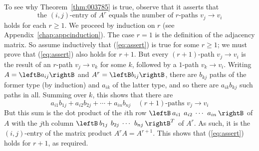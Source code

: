 To see why Theorem~\ref{thm:003785} is true, observe that it asserts that
\begin{equation} \label{eq:assert}
\mbox{the } (i, j)\mbox{-entry of } A^{r} \mbox{ equals the number of } r\mbox{-paths } v_{j} \rightarrow v_{i}
\end{equation}
holds for each $r \geq 1$. We proceed by induction on $r$ (see Appendix~\ref{chap:appcinduction}). The case $r = 1$ is the definition of the adjacency matrix. So assume inductively that (\ref{eq:assert}) is true for some $r \geq 1$; we must prove that (\ref{eq:assert}) also holds for $r + 1$. But every $(r + 1)$-path $v_{j} \to v_{i}$ is the result of an $r$-path $v_{j} \to v_{k}$ for some $k$, followed by a $1$-path $v_{k} \to v_{i}$. Writing $A = \leftB a_{ij} \rightB$ and $A^{r} = \leftB b_{ij} \rightB$, there are $b_{kj}$ paths of the former type (by induction) and $a_{ik}$ of the latter type, and so there are $a_{ik}b_{kj}$ such paths in all. Summing over $k$, this shows that there are
\begin{equation*}
a_{i1}b_{1j} + a_{i2}b_{2j} + \cdots + a_{in}b_{nj} \quad (r + 1)\mbox{-paths } v_{j} \rightarrow v_{i}
\end{equation*}
But this sum is the dot product of the $i$th row $\leftB \arraycolsep=2pt \begin{array}{cccc}
a_{i1} & a_{i2} & \cdots & a_{in}
\end{array} \rightB$ of $A$ with the $j$th column $\leftB \arraycolsep=2pt \begin{array}{cccc}
b_{1j} & b_{2j} & \cdots & b_{nj}
\end{array} \rightB^{T}$ of $A^{r}$. As such, it is the $(i, j)$-entry of the matrix product $A^{r}A = A^{r+1}$. This shows that (\ref{eq:assert}) holds for $r + 1$, as required.
